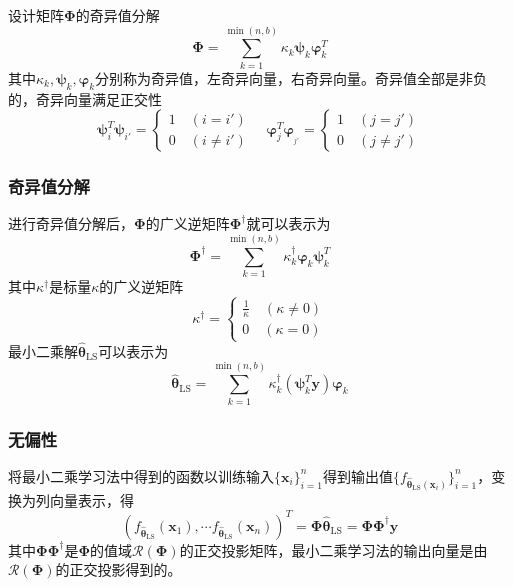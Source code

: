 \documentclass{beamer}
\newcommand{\tmmathbf}[1]{\ensuremath{\boldsymbol{#1}}}
\newcommand{\tmop}[1]{\ensuremath{\operatorname{#1}}}
\begin{document}
\begin{CJK*}{UTF8}{gbsn}
{{\begin{frame}
  设计矩阵$\tmmathbf{\Phi}$的奇异值分解
  \[ \tmmathbf{\Phi}= \sum_{k = 1}^{\min (n, b)} \kappa_k \tmmathbf{\psi}_k
     \tmmathbf{\varphi}_k^T \]
  其中$\kappa_k, \tmmathbf{\psi}_k,
  \tmmathbf{\varphi}_k$分别称为奇异值，左奇异向量，右奇异向量。奇异值全部是非负的，奇异向量满足正交性
  \[ \tmmathbf{\psi}_i^T \tmmathbf{\psi}_{i'} = \text{}
     \left\{\begin{array}{l}
       1 \quad (i = i')\\
       0 \quad (i \neq i')
     \end{array}\right. \quad \tmmathbf{\varphi}_j^T
     \tmmathbf{\varphi}_{_{j'}} = \left\{\begin{array}{l}
       1 \quad (j = j')\\
       0 \quad (j \neq j')
     \end{array}\right. \]
  
\end{frame}}{\begin{frame}
  \frametitle{奇异值分解}
  
  进行奇异值分解后，$\tmmathbf{\Phi}$的广义逆矩阵$\tmmathbf{\Phi}^{\dag}$就可以表示为
  \[ \tmmathbf{\Phi}^{\dag} = \sum_{k = 1}^{\min (n, b)} \kappa_k^{\dag}
     \tmmathbf{\varphi}_k \tmmathbf{\psi}_k^T \]
  其中$\kappa^{\dag}$是标量$\kappa$的广义逆矩阵
  \[ \kappa^{\dag} = \left\{\begin{array}{l}
       \frac{1}{\kappa} \quad (\kappa \neq 0)\\
       0 \quad (\kappa = 0)
     \end{array}\right. \]
  最小二乘解$\hat{\tmmathbf{\theta}}_{\tmop{LS}}$可以表示为
  \[ \hat{\tmmathbf{\theta}}_{\tmop{LS}} = \sum_{k = 1}^{\min (n, b)}
     \kappa_k^{\dag} (\tmmathbf{\psi}_k^T \tmmathbf{y}) \tmmathbf{\varphi}_k
  \]
\end{frame}}{\begin{frame}
  \frametitle{无偏性}
  
  将最小二乘学习法中得到的函数以训练输入$\{ \tmmathbf{x}_i
  \}_{i = 1}^n$得到输出值$\{ f_{{\hat{\tmmathbf{\theta}}_{\tmop{LS}}} 
  (\tmmathbf{x}_i)} \}_{i = 1}^n$，变换为列向量表示，得
  \[ (f_{\hat{\tmmathbf{\theta}}_{\tmop{LS}}} (\tmmathbf{x}_1), \cdots
     f_{\hat{\tmmathbf{\theta}}_{\tmop{LS}}} (\tmmathbf{x}_n))^T
     =\tmmathbf{\Phi} \hat{\tmmathbf{\theta}}_{\tmop{LS}}
     =\tmmathbf{\Phi}\tmmathbf{\Phi}^{\dag} \tmmathbf{y} \]
  其中$\tmmathbf{\Phi}\tmmathbf{\Phi}^{\dag}$是$\tmmathbf{\Phi}$的值域$\mathcal{R}
  (\tmmathbf{\Phi})$的正交投影矩阵，最小二乘学习法的输出向量是由$\mathcal{R}
  (\tmmathbf{\Phi})$的正交投影得到的。
  

\end{frame}}}
\end{CJK*}
\end{document}
